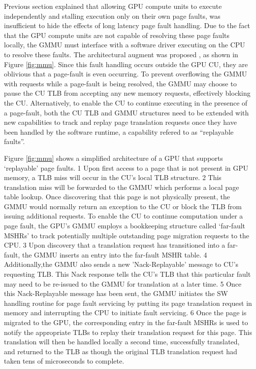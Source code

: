 Previous section explained that allowing GPU compute units to execute independently and stalling execution only on their own page faults, was insufficient to hide the effects of long latency page fault handling. Due to the fact that the GPU compute units are not capable of resolving these page faults locally, the GMMU must interface with a software driver executing on the CPU to resolve these faults. The architectural augment was proposed \cite{7446077}, as shown in Figure \ref{fig:mmu}. Since this fault handling occurs outside the GPU CU, they are oblivious that a page-fault is even occurring. To prevent overflowing the GMMU with requests while a page-fault is being resolved, the GMMU may choose to pause the CU TLB from accepting any new memory requests, effectively blocking the CU. Alternatively, to enable the CU to continue executing in the presence of a page-fault, both the CU TLB and GMMU structures need to be extended with new capabilities to track and replay page translation requests once they have been handled by the software runtime, a capability refered to as “replayable faults”. 

Figure \ref{fig:mmu} shows a simplified architecture of a GPU that supports ‘replayable’ page faults. \textcircled{\small{1}} Upon first access to a page that is not present in GPU memory, a TLB miss will occur in the CU’s local TLB structure. \textcircled{\small{2}} This translation miss will be forwarded to the GMMU which performs a local page table lookup. Once discovering that this page is not physically present, the GMMU would normally return an exception to the CU or block the TLB from issuing additional requests. To enable the CU to continue computation under a page fault, the GPU’s GMMU employs a bookkeeping structure called ‘far-fault MSHRs’ to track potentially multiple outstanding page migration requests to the CPU. \textcircled{\small{3}} Upon discovery that a translation request has transitioned into a far-fault, the GMMU inserts an entry into the far-fault MSHR table. \textcircled{\small{4}} Additionally,the GMMU also sends a new ’Nack-Replayable’ message to CU’s requesting TLB. This Nack response tells the CU’s TLB that this particular fault may need to be re-issued to the GMMU for translation at a later time. \textcircled{\small{5}} Once this Nack-Replayable message has been sent, the GMMU initiates the SW handling routine for page fault servicing by putting its page translation request in memory and interrupting the CPU to initiate fault servicing. \textcircled{\small{6}} Once the page is migrated to the GPU, the corresponding entry in the far-fault MSHRs is used to notify the appropriate TLBs to replay their translation request for this page. This translation will then be handled locally a second time, successfully translated, and returned to the TLB as though the original TLB translation request had taken tens of microseconds to complete.

